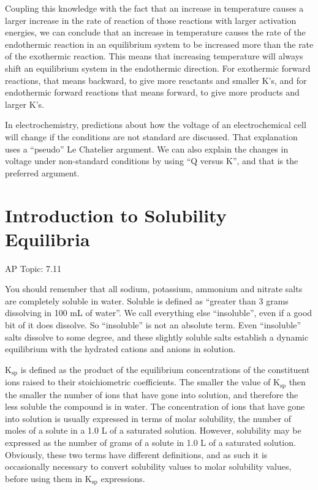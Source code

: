 \documentclass[../chem.tex]{subfiles}
\begin{document}
Coupling this knowledge with the fact that an increase in temperature causes a larger increase in the rate of reaction of those reactions with larger activation energies, 
we can conclude that an increase in temperature causes the rate of the endothermic reaction in an equilibrium system to be increased more than the rate of the exothermic reaction. 
This means that increasing temperature will always shift an equilibrium system in the endothermic direction. For exothermic forward reactions, that means backward, 
to give more reactants and smaller K's, and for endothermic forward reactions that means forward, to give more products and larger K's.

In electrochemistry, predictions about how the voltage of an electrochemical cell will change if the conditions are not standard are discussed. That explanation uses a ``pseudo'' Le Chatelier argument. We can also explain the changes in voltage 
under non-standard conditions by using ``Q versus K'', and that is the preferred argument.
\section{Introduction to Solubility Equilibria}
AP Topic: 7.11

You should remember that all sodium, potassium, ammonium and nitrate salts are completely soluble in water. Soluble is defined as ``greater than 3 grams dissolving in 100 mL of water''. We call everything else 
``insoluble'', even if a good bit of it does dissolve. So ``insoluble'' is not an absolute term. Even ``insoluble'' salts dissolve to some degree, and these slightly 
soluble salts establish a dynamic equilibrium with the hydrated cations and anions in solution.

K$_{\text{sp}}$ is defined as the product of the equilibrium concentrations of the constituent ions raised to their stoichiometric coefficients. 
The smaller the value of K$_{\text{sp}}$ then the smaller the number of ions that have gone into solution, and therefore the less soluble the compound is in water. The concentration 
of ions that have gone into solution is usually expressed in terms of molar solubility, the number of moles of a solute in a 1.0 L of a saturated solution. 
However, solubility may be expressed as the number of grams of a solute in 1.0 L of a saturated solution. Obviously, these two terms have different definitions, and as such 
it is occasionally necessary to convert solubility values to molar solubility values, before using them in K$_{\text{sp}}$ expressions.
\end{document}
